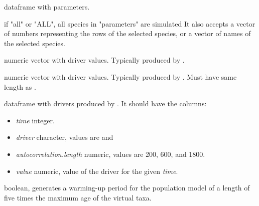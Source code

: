 \documentclass[letterpaper]{book}
\begin{document}
%
\begin{Arguments}
\begin{ldescription}
\item[\code{parameters}] dataframe with parameters.

\item[\code{species}] if "all" or "ALL", all species in "parameters" are simulated It also accepts a vector of numbers representing the rows of the selected species, or a vector of names of the selected species.

\item[\code{driver.A}] numeric vector with driver values. Typically produced by .

\item[\code{driver.B}] numeric vector with driver values.  Typically produced by . Must have same length as .

\item[\code{drivers}] dataframe with drivers produced by . It should have the columns:
\begin{itemize}

\item \emph{time} integer.
\item \emph{driver} character, values are  and 
\item \emph{autocorrelation.length} numeric, values are 200, 600, and 1800.
\item \emph{value} numeric, value of the driver for the given \emph{time}.

\end{itemize}


\item[\code{burnin}] boolean, generates a warming-up period for the population model of a length of five times the maximum age of the virtual taxa.
\end{ldescription}
\end{Arguments}
%
\end{document}
